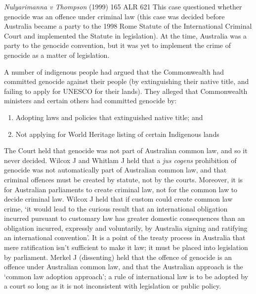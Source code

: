 \begin{casedetails}{\textit{Nulyarimanna v Thompson} (1999) 165 ALR 621}\label{case: Nulyarimanna v Thompson}
    \flushleft
    This case questioned whether genocide was an offence under criminal law (this case was decided before Australia became a party to the 1998 Rome Statute of the International Criminal Court and implemented the Statute in legislation). At the time, Australia was a party to the genocide convention, but it was yet to implement the crime of genocide as a matter of legislation.

    \vspace{\baselineskip}

    A number of indigenous people had argued that the Commonwealth had committed genocide against their people (by extinguishing their native title, and failing to apply for UNESCO for their lands). They alleged that Commonwealth ministers and certain others had committed genocide by:
    \begin{enumerate}[label=(\alph*)]
        \item Adopting laws and policies that extinguished native title; and
        \item Not applying for World Heritage listing of certain Indigenous lands
    \end{enumerate}

    The Court held that genocide was not part of Australian common law, and so it never decided. Wilcox J and Whitlam J held that a \textit{jus cogens} prohibition of genocide was not automatically part of Australian common law, and that criminal offences must be created by statute, not by the courts. Moreover, it is for Australian parliaments to create criminal law, not for the common law to decide criminal law. Wilcox J held that if custom could create common law crime, `it would lead to the curious result that an international obligation incurred pursuant to customary law has greater domestic consequences than an obligation incurred, expressly and voluntarily, by Australia signing and ratifying an international convention'. It is a point of the treaty process in Australia that mere ratification isn't sufficient to make it law; it must be placed into legislation by parliament. Merkel J (dissenting) held that the offence of genocide is an offence under Australian common law, and that the Australian approach is the `common law adoption approach'; a rule of international law is to be adopted by a court so long as it is not inconsistent with legislation or public policy.


\end{casedetails}
